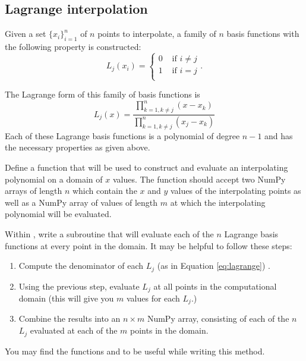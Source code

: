 \subsection*{Lagrange interpolation} %
Given a set $\{x_i\}_{i=1}^n$ of $n$ points to interpolate, a family of $n$ basis functions with the following property is constructed:
\[
L_j(x_i) = \begin{cases} 0 &\mbox{ if } i \neq j\\ 1 &\mbox{ if } i =j \\ \end{cases}.
\]

The Lagrange form of this family of basis functions is
\begin{equation}
\label{eq:lagrange}
L_j(x) = \frac{\displaystyle\prod_{k=1, k \neq j}^n (x-x_k)}{\displaystyle\prod_{k=1, k \neq j}^n (x_j-x_k)}
\end{equation}
Each of these Lagrange basis functions is a polynomial of degree $n-1$ and has the necessary properties as given above.

\begin{problem}
Define a function  that will be used to construct and evaluate an interpolating polynomial on a domain of $x$ values. 
The function should accept two NumPy arrays of length $n$ which contain the $x$ and $y$ values of the interpolating points as well as a NumPy array of values of length $m$ at which the interpolating polynomial will be evaluated.

Within , write a subroutine that will evaluate each of the $n$ Lagrange basis functions at every point in the domain.
It may be helpful to follow these steps:
\begin{enumerate}
\item Compute the denominator of each $L_j$ (as in Equation \ref{eq:lagrange}) .
\item Using the previous step, evaluate $L_j$ at all points in the computational domain (this will give you $m$ values for each $L_j$.)
\item Combine the results into an  $n \times m$ NumPy array, consisting of each of the $n$ $L_j$ evaluated at each of the $m$ points in the domain.
\end{enumerate}

You may find the functions  and  to be useful while writing this method.
\label{prob:lagrange_basis}
\end{problem}

